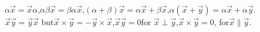 \documentclass{article}
\begin{document}
$\alpha\vec{x} = \vec{x}\alpha$,\hfill$\alpha\beta\vec{x}
= \beta\alpha\vec{x}$,\hfill$(\alpha + \beta)\vec{x} = \alpha\vec{x} +
\beta\vec{x}$,\hfill $\alpha(\vec{x} + \vec{y})
= \alpha\vec{x} + \alpha\vec{y}$.\\
\hspace*{1.5em}$\vec{x}\vec{y} = \vec{y}\vec{x}$\hfill
but\hfill$\vec{x}\times\vec{y} =
-\vec{y}\times\vec{x}$,\hfill\hfill$\vec{x}\vec{y} = 0$\hfill for\hfill%
$\vec{x}\perp\vec{y}$,\hfill\hfill$\vec{x}\times\vec{y} = 0$,\hfill
for\hfill$\vec{x}\parallel\vec{y}$.
\end{document}

